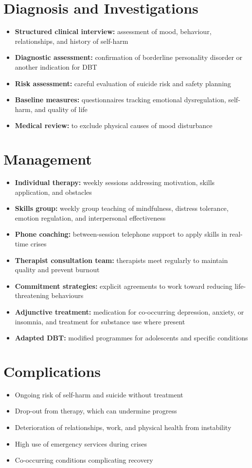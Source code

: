 \section*{Diagnosis and Investigations}
\begin{itemize}
    \item \textbf{Structured clinical interview:} assessment of mood, behaviour, relationships, and history of self-harm
    \item \textbf{Diagnostic assessment:} confirmation of borderline personality disorder or another indication for DBT
    \item \textbf{Risk assessment:} careful evaluation of suicide risk and safety planning
    \item \textbf{Baseline measures:} questionnaires tracking emotional dysregulation, self-harm, and quality of life
    \item \textbf{Medical review:} to exclude physical causes of mood disturbance
\end{itemize}

\section*{Management}
\begin{itemize}
    \item \textbf{Individual therapy:} weekly sessions addressing motivation, skills application, and obstacles
    \item \textbf{Skills group:} weekly group teaching of mindfulness, distress tolerance, emotion regulation, and interpersonal effectiveness
    \item \textbf{Phone coaching:} between-session telephone support to apply skills in real-time crises
    \item \textbf{Therapist consultation team:} therapists meet regularly to maintain quality and prevent burnout
    \item \textbf{Commitment strategies:} explicit agreements to work toward reducing life-threatening behaviours
    \item \textbf{Adjunctive treatment:} medication for co-occurring depression, anxiety, or insomnia, and treatment for substance use where present
    \item \textbf{Adapted DBT:} modified programmes for adolescents and specific conditions
\end{itemize}

\section*{Complications}
\begin{itemize}
    \item Ongoing risk of self-harm and suicide without treatment
    \item Drop-out from therapy, which can undermine progress
    \item Deterioration of relationships, work, and physical health from instability
    \item High use of emergency services during crises
    \item Co-occurring conditions complicating recovery
\end{itemize}

